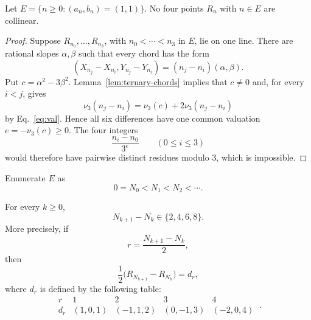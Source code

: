 \documentclass[12pt,reqno]{article}
\newcommand{\vp}{\nu_3}
\begin{document}
\begin{lemma}\label{lem:core}
Let $E=\{n\ge0:(a_n,b_n)=(1,1)\}$.  No four points $R_n$ with $n\in E$
are collinear.
\end{lemma}

\begin{proof}
Suppose $R_{n_0},\ldots,R_{n_3}$, with $n_0<\cdots<n_3$ in $E$, lie
on one line.  There are rational slopes $\alpha,\beta$ such that every
chord has the form
\[
 (X_{n_j}-X_{n_i},Y_{n_j}-Y_{n_i})
   =(n_j-n_i)(\alpha,\beta).
\]
Put $c=\alpha^2-3\beta^2$.  Lemma~\ref{lem:ternary-chords} implies
that $c\ne0$ and, for every $i<j$, gives
\[
 \vp(n_j-n_i)=\vp(c)+2\vp(n_j-n_i)
\]
by Eq.~\eqref{eq:val}.  Hence all six differences have one common
valuation $e=-\vp(c)\geq0$.  The four integers
\[
 \frac{n_i-n_0}{3^e}\qquad(0\leq i\leq3)
\]
would therefore have pairwise distinct residues modulo $3$, which is
impossible.
\end{proof}



Enumerate $E$ as
\[
 0=N_0<N_1<N_2<\cdots.
\]

\begin{proposition}\label{prop:return-steps}
For every $k\geq 0$,
\[
 N_{k+1}-N_k\in\{2,4,6,8\}.
\]
More precisely, if
\[
 r=\frac{N_{k+1}-N_k}{2},
\]
then
\begin{equation}\label{eq:return}
 \frac12\bigl(R_{N_{k+1}}-R_{N_k}\bigr)=d_r,
\end{equation}
where $d_r$ is defined by the 
following table:
\begin{equation}\label{eq:d_r_vectors}
 \begin{array}{c|cccc}
  r&1&2&3&4\\ \hline
  d_r&(1,0,1)&(-1,1,2)&(0,-1,3)&(-2,0,4)
 \end{array} \ .
\end{equation}
\end{proposition}
\end{document}
